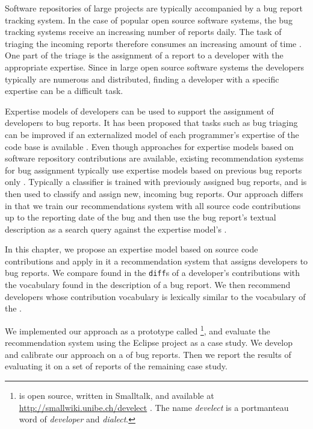 Software repositories of large projects are typically accompanied by a bug report tracking system. In the case of popular open source software systems, the bug tracking systems receive an increasing number of reports daily. The task of triaging the incoming reports therefore consumes an increasing amount of time \cite{Anvi06b}. One part of the triage is the assignment of a report to a developer with the appropriate expertise. Since in large open source software systems the developers typically are numerous and distributed, finding a developer with a specific expertise can be a difficult task.

Expertise models of developers can be used to support the assignment of developers to bug reports. It has been proposed that tasks such as bug triaging can be improved if an externalized model of each programmer's expertise of the code base is available \cite{Frit07a}. Even though approaches for expertise models based on software repository contributions are available, existing recommendation systems for bug assignment typically use expertise models based on previous bug reports only \cite{Anvi06a,Canf05a,Cubr04b,Mock02b,Lucc02a}.
Typically a classifier is trained with previously assigned bug reports, and is then used to classify and assign new, incoming bug reports.
Our approach differs in that we train our recommendations system with all source code contributions up to the reporting date of the bug and then use the bug report's textual description as a search query against the expertise model's \TAM.

In this chapter, we propose an expertise model based on source code contributions and apply in it a recommendation system that assigns developers to bug reports. We compare \VOC found in the \verb$diff$s of a developer's contributions with the vocabulary found in the description of a bug report. We then recommend developers whose contribution vocabulary is lexically similar to the vocabulary of the \BR.

We implemented our approach as a prototype called \DEVLECT\footnote{\DEVLECT is open source, written in Smalltalk, and available at \url{http://smallwiki.unibe.ch/develect} . The name \emph{develect} is a portmanteau word of \emph{developer} and \emph{dialect}. }, and evaluate the recommendation system using the Eclipse project as a case study. We develop and calibrate our approach on a \trainingset of bug reports. Then we report the results of evaluating it on a set of reports of the remaining case study.

